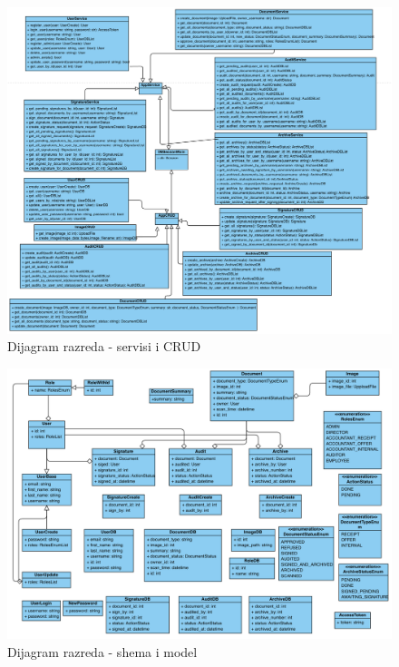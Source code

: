 			\begin{figure}[H]
				\includegraphics[width=\textwidth]{slike/razredi_serviceCRUD.png} 
				\caption{Dijagram razreda - servisi i CRUD}
				\label{fig:dijagramRazreda1}
			\end{figure}
			
			\begin{figure}[H]
				\includegraphics[width=\textwidth]{slike/razredi_shemaModel.png} 
				\caption{Dijagram razreda - shema i model}
				\label{fig:dijagramRazreda2}
			\end{figure}
			
			
